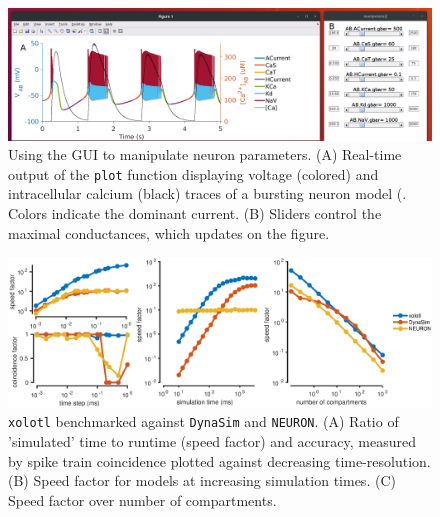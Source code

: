 \documentclass{frontiersSCNS} %
\begin{document}
\begin{figure}
	\centering
	\includegraphics[width=1.0\linewidth]{gfx/puppeteer_screenshot}
	\caption{Using the GUI to manipulate neuron parameters. (A) Real-time output of the \texttt{plot} function displaying voltage (colored) and intracellular calcium (black) traces of a bursting neuron model (\cite{prinzAlternativeHandtuningConductancebased2003, prinzSimilarNetworkActivity2004}. Colors indicate the dominant current. (B) Sliders control the maximal conductances, which updates on the figure.}
	\label{fig:puppeteerscreenshot}
\end{figure}


\begin{figure}
	\centering
	\includegraphics[width=1.0\linewidth]{gfx/figure_benchmark}
	\caption{\texttt{xolotl} benchmarked against \texttt{DynaSim} and \texttt{NEURON}. (A) Ratio of 'simulated' time to runtime (speed factor) and accuracy, measured by spike train coincidence plotted against decreasing time-resolution. (B) Speed factor for models at increasing simulation times. (C) Speed factor over number of compartments.}
	\label{fig:figurebenchmark}
\end{figure}
\end{document}
